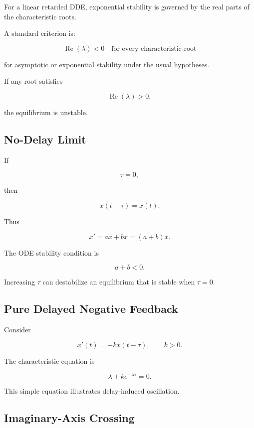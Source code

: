 For a linear retarded DDE, exponential stability is governed by the real
parts of the characteristic roots.

A standard criterion is:

\[
\boxed{
\operatorname{Re}(\lambda)<0
\quad
\text{for every characteristic root}
}
\]

for asymptotic or exponential stability under the usual hypotheses.

If any root satisfies

\[
\boxed{
\operatorname{Re}(\lambda)>0,
}
\]

the equilibrium is unstable.

\subsection{No-Delay Limit}
\label{subsec:dde-no-delay-limit}

If

\[
\tau=0,
\]

then

\[
x(t-\tau)=x(t).
\]

Thus

\[
x'
=
ax+bx
=
(a+b)x.
\]

The ODE stability condition is

\[
\boxed{
a+b<0.
}
\]

Increasing \(\tau\) can destabilize an equilibrium that is stable when
\(\tau=0\).

\subsection{Pure Delayed Negative Feedback}
\label{subsec:pure-delayed-negative-feedback}

Consider

\[
\boxed{
x'(t)
=
-kx(t-\tau),
\qquad
k>0.
}
\]

The characteristic equation is

\[
\boxed{
\lambda
+
ke^{-\lambda\tau}
=
0.
}
\]

This simple equation illustrates delay-induced oscillation.

\subsection{Imaginary-Axis Crossing}
\label{subsec:dde-imaginary-axis-crossing}

